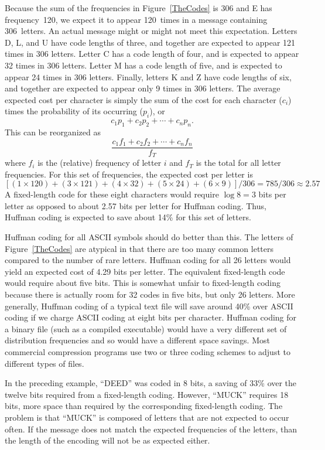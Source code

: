 \begin{example}
Because the sum of the frequencies in
Figure~\ref{TheCodes} is 306 and E has frequency~120, we expect it to
appear 120~times in a message containing 306~letters.
An actual message might or might not meet this expectation.
Letters D, L, and U have code lengths of three, and together are
expected to appear 121 times in 306 letters.
Letter C has a code length of four, and is expected to appear 32
times in 306 letters.
Letter M has a code length of five, and is expected to appear 24
times in 306 letters.
Finally, letters K and Z have code lengths of six, and
together are expected to appear only 9 times in 306 letters.
The average expected cost per character is simply the sum of the cost
for each character (\(c_i\)) times the probability of its occurring
(\(p_i\)), or
\[c_1 p_1 + c_2 p_2 + \cdots + c_n p_n.\]
\noindent This can be reorganized as
\[\frac{c_1 f_1 + c_2 f_2 + \cdots + c_n f_n}{f_T}\]
\noindent where \(f_i\) is the (relative) frequency of letter \(i\) and
\(f_T\) is the total for all letter frequencies.
For this set of frequencies, the expected cost per letter is
\[ [(1 \times 120) + (3 \times 121) + (4 \times 32) +
    (5 \times 24) + (6 \times 9)]/306 = 785/306 \approx 2.57 \]
A fixed-length code for these eight characters would require
\(\log 8 = 3\) bits per letter as opposed to about 2.57 bits per
letter for Huffman coding.
Thus, Huffman coding is expected to save about 14\% for this set of
letters.
\end{example}

Huffman coding for all ASCII symbols should do
better than this.
The letters of Figure~\ref{TheCodes} are atypical in that there are
too many common letters compared to the number of rare letters.
Huffman coding for all 26 letters would yield an expected cost of 4.29
bits per letter.
The equivalent fixed-length code would require about five bits.
This is somewhat unfair to fixed-length coding because there is
actually room for 32 codes in five bits, but only 26 letters.
More generally, Huffman coding of a typical text file will save around
40\% over ASCII coding if we charge ASCII coding at eight bits per
character.
Huffman coding for a binary file (such as a compiled executable) would
have a very different set of distribution frequencies and so would
have a different space savings.
Most commercial compression programs use two or three
coding schemes to adjust to different types of files.

In the preceding example, ``DEED'' was coded in 8 bits, a saving of
33\% over the twelve bits required from a fixed-length coding.
However, ``MUCK'' requires 18 bits, more space than required by the
corresponding fixed-length coding.
The problem is that ``MUCK'' is composed of letters that are not
expected to occur often.
If the message does not match the expected frequencies of the
letters, than the length of the encoding will not be as expected
either.

